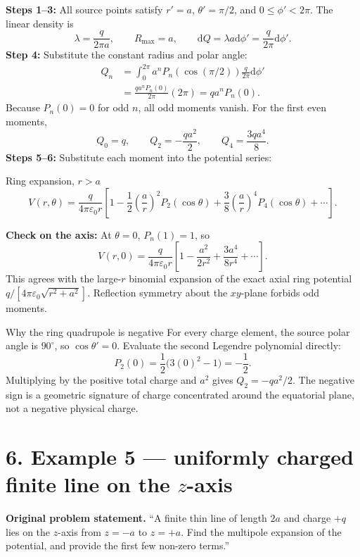 \documentclass[10pt,letterpaper]{article}
\newcommand{\eps}{\varepsilon_0}\newcommand{\dd}{\mathrm d}
\begin{document}
\begin{center}\end{center}
\textbf{Steps 1--3:} All source points satisfy $r'=a$, $\theta'=\pi/2$, and $0\le\phi'<2\pi$. The linear density is
\[\lambda=\frac{q}{2\pi a},\qquad R_{\max}=a,\qquad\dd Q=\lambda a\dd\phi'=\frac{q}{2\pi}\dd\phi'.\]
\textbf{Step 4:} Substitute the constant radius and polar angle:
\begin{align*}Q_n&=\int_0^{2\pi}a^nP_n(\cos(\pi/2))\frac{q}{2\pi}\dd\phi'\\
&=\frac{qa^nP_n(0)}{2\pi}(2\pi)=qa^nP_n(0).
\end{align*}
Because $P_n(0)=0$ for odd $n$, all odd moments vanish. For the first even moments,
\[Q_0=q,\qquad Q_2=-\frac{qa^2}{2},\qquad Q_4=\frac{3qa^4}{8}.\]
\textbf{Steps 5--6:} Substitute each moment into the potential series:
\begin{result}{Ring expansion, $r>a$}
\[\boxed{V(r,\theta)=\frac{q}{4\pi\eps r}\left[1-\frac12\left(\frac ar\right)^2P_2(\cos\theta)+\frac38\left(\frac ar\right)^4P_4(\cos\theta)+\cdots\right].}\]
\end{result}
\textbf{Check on the axis:} At $\theta=0$, $P_n(1)=1$, so
\[V(r,0)=\frac{q}{4\pi\eps r}\left[1-\frac{a^2}{2r^2}+\frac{3a^4}{8r^4}+\cdots\right].\]
This agrees with the large-$r$ binomial expansion of the exact axial ring potential $q/[4\pi\eps\sqrt{r^2+a^2}]$. Reflection symmetry about the $xy$-plane forbids odd moments.
\begin{insight}{Why the ring quadrupole is negative}
For every charge element, the source polar angle is $90^\circ$, so $\cos\theta'=0$. Evaluate the second Legendre polynomial directly:
\[P_2(0)=\frac12\big(3(0)^2-1\big)=-\frac12.\]
Multiplying by the positive total charge and $a^2$ gives $Q_2=-qa^2/2$. The negative sign is a geometric signature of charge concentrated around the equatorial plane, not a negative physical charge.
\end{insight}
\section*{6. Example 5 --- uniformly charged finite line on the $z$-axis}
\textbf{Original problem statement.} ``A finite thin line of length $2a$ and charge $+q$ lies on the $z$-axis from $z=-a$ to $z=+a$. Find the multipole expansion of the potential, and provide the first few non-zero terms.''
\end{document}
